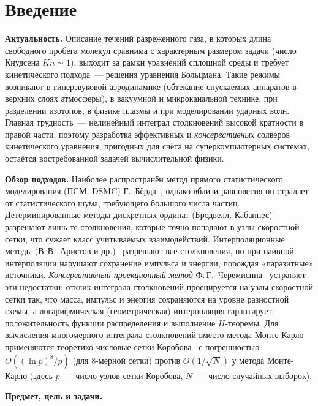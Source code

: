 \chapter*{Введение}

\textbf{Актуальность.}
Описание течений разреженного газа, в которых длина свободного пробега молекул сравнима с характерным размером задачи
(число Кнудсена $Kn\sim 1$), выходит за рамки уравнений сплошной среды и требует кинетического подхода~--- решения
уравнения Больцмана.
Такие режимы возникают в гиперзвуковой аэродинамике (обтекание спускаемых аппаратов в верхних слоях атмосферы), в
вакуумной и микроканальной технике, при разделении изотопов, в физике плазмы и при моделировании ударных волн.
Главная трудность~--- нелинейный интеграл столкновений высокой кратности в правой части, поэтому разработка эффективных
и \emph{консервативных} солверов кинетического уравнения, пригодных для счёта на суперкомпьютерных системах, остаётся
востребованной задачей вычислительной физики.

\textbf{Обзор подходов.}
Наиболее распространён метод прямого статистического моделирования (ПСМ, DSMC) Г.~Бёрда~\cite{Bird}, однако вблизи
равновесия он страдает от статистического шума, требующего большого числа частиц.
Детерминированные методы дискретных ординат (Бродвелл, Кабаннес) разрешают лишь те столкновения, которые точно попадают
в узлы скоростной сетки, что сужает класс учитываемых взаимодействий.
Интерполяционные методы (В.\,В.~Аристов и др.)~\cite{Aristov} разрешают все столкновения, но при наивной интерполяции
нарушают сохранение импульса и энергии, порождая «паразитные» источники.
\emph{Консервативный проекционный метод} Ф.\,Г.~Черемисина~\cite{Tcher,TcherJCP} устраняет эти недостатки: отклик
интеграла столкновений проецируется на узлы скоростной сетки так, что масса, импульс и энергия сохраняются на уровне
разностной схемы, а логарифмическая (геометрическая) интерполяция гарантирует положительность функции распределения и
выполнение $H$-теоремы.
Для вычисления многомерного интеграла столкновений вместо метода Монте-Карло применяются теоретико-числовые сетки
Коробова~\cite{Korobov} с погрешностью $O\!\left((\ln p)^{8}/p\right)$ (для 8-мерной сетки) против
$O\!\left(1/\sqrt{N}\right)$ у метода Монте-Карло (здесь $p$~--- число узлов сетки Коробова, $N$~--- число случайных
выборок).

\textbf{Предмет, цель и задачи.}

